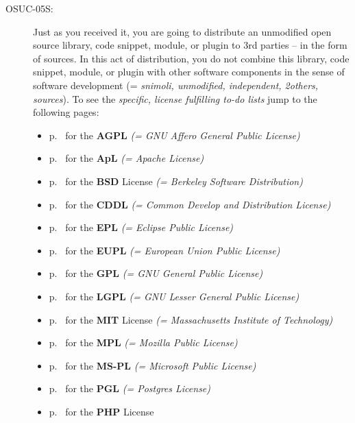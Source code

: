 \begin{description}
\item[OSUC-05S:]\label{OSUC-05S-DEF} Just as you received it, you are going to
distribute an unmodified open source library, code snippet, module, or plugin to
3rd parties  -- in the form of sources. In this act of distribution, you do not
combine this library, code snippet, module, or plugin with other software
components in the sense of software development (= \textit{snimoli, unmodified,
independent, 2others, sources}). To see the \textit{specific, license fulfilling
to-do lists} jump to the following pages:
  \begin{itemize}
    \item p.\ \pageref{OSUC-05S-AGPL} for the \textbf{AGPL}
      \textit{(= GNU Affero General Public License)} 
    \item p.\ \pageref{OSUC-05S-Apache20} for the \textbf{ApL}
      \textit{(= Apache License)}
    \item p.\ \pageref{OSUC-05S-BSD} for the \textbf{BSD} License
      \textit{(= Berkeley Software Distribution)}
    \item p.\ \pageref{OSUC-05S-CDDL} for the \textbf{CDDL}
      \textit{(= Common Develop and Distribution License)}  
    \item p.\ \pageref{OSUC-05S-EPL} for the \textbf{EPL}
      \textit{(= Eclipse Public License)}     
    \item p.\ \pageref{OSUC-05S-EUPL} for the \textbf{EUPL}
      \textit{(= European Union Public License)} 
    \item p.\ \pageref{OSUC-05S-GPL} for the \textbf{GPL}
       \textit{(= GNU General Public License)} 
    \item p.\ \pageref{OSUC-05S-LGPL} for the \textbf{LGPL}
      \textit{(= GNU Lesser General Public License)}           
    \item p.\ \pageref{OSUC-05S-MIT} for the \textbf{MIT} License
       \textit{(= Massachusetts Institute of Technology)} 
    \item p.\ \pageref{OSUC-05S-MPL} for the \textbf{MPL}
      \textit{(= Mozilla Public License)}     
    \item p.\ \pageref{OSUC-05S-MS-PL} for the \textbf{MS-PL}
      \textit{(= Microsoft Public License)} 
    \item p.\ \pageref{OSUC-05S-PGL} for the \textbf{PGL}
      \textit{(= Postgres License)} 
    \item p.\ \pageref{OSUC-05S-PHP} for the \textbf{PHP} License 
  \end{itemize}


\end{description}
